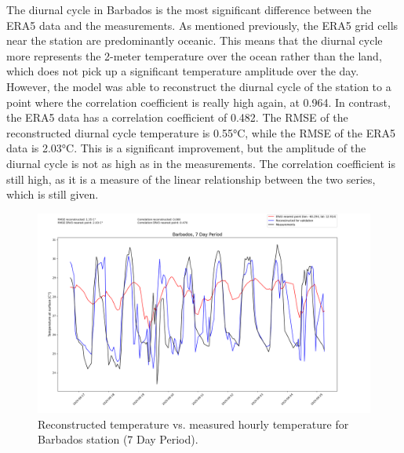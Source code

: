 The diurnal cycle in Barbados is the most significant difference between the ERA5 data and the measurements.
As mentioned previously, the ERA5 grid cells near the station are predominantly oceanic.
This means that the diurnal cycle more represents the 2-meter temperature over the ocean rather than the land, which does not pick up a significant temperature amplitude over the day.
However, the model was able to reconstruct the diurnal cycle of the station to a point where the correlation coefficient is really high again, at 0.964.
In contrast, the ERA5 data has a correlation coefficient of 0.482.
The RMSE of the reconstructed diurnal cycle temperature is 0.55°C, while the RMSE of the ERA5 data is 2.03°C.
This is a significant improvement, but the amplitude of the diurnal cycle is not as high as in the measurements.
The correlation coefficient is still high, as it is a measure of the linear relationship between the two series, which is still given.

\begin{figure}
    \centering
    \includegraphics[width=1.00\textwidth]{resources/images/charts/barbados_eval_grib_final/Barbados, 7 Day Period_1_2.png}
    \caption{Reconstructed temperature vs. measured hourly temperature for Barbados station (7 Day Period).}
\end{figure}

